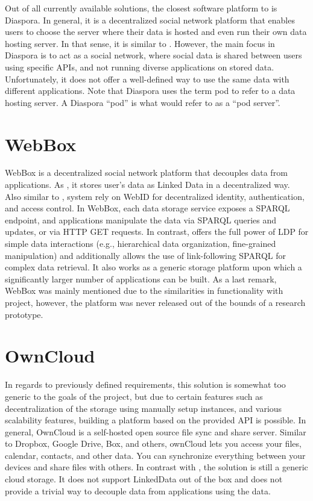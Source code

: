 Out of all currently available solutions, the closest software platform to \solid{} is Diaspora. In general, it is a decentralized social network platform that enables users to choose the server where their data is hosted and even run their own data hosting server. In that sense, it is similar to \solid{}. However, the main focus in Diaspora is to act as a social network, where social data is shared between users using specific APIs, and not running diverse applications on stored data. Unfortunately, it does not offer a well-defined way to use the same data with different applications. Note that Diaspora uses the term pod to refer to a data hosting server. A Diaspora “pod” is what \solid{} would refer to as a “pod server”.

\section{WebBox}

WebBox is a decentralized social network platform that decouples data from applications. As \solid{}, it stores user’s data as Linked Data in a decentralized way. Also similar to \solid{}, system rely on WebID for decentralized identity, authentication, and access control. In WebBox, each data storage service exposes a SPARQL endpoint, and applications manipulate the data via SPARQL queries and updates, or via HTTP GET requests. In contrast, \solid{} offers the full power of LDP for simple data interactions (e.g., hierarchical data organization, fine-grained manipulation) and additionally allows the use of link-following SPARQL for complex data retrieval. It also works as a generic storage platform upon which a significantly larger number of applications can be built. As a last remark, WebBox was mainly mentioned due to the similarities in functionality with \solid{} project, however, the platform was never released out of the bounds of a research prototype.

\section{OwnCloud}

In regards to previously defined requirements, this solution is somewhat too generic to the goals of the project, but due to certain features such as decentralization of the storage using manually setup instances, and various scalability features, building a platform based on the provided API is possible. In general, OwnCloud is a self-hosted open source file sync and share server. Similar to Dropbox, Google Drive, Box, and others, ownCloud lets you access your files, calendar, contacts, and other data. You can synchronize everything between your devices and share files with others. In contrast with \solid{}, the solution is still a generic cloud storage. It does not support LinkedData out of the box and does not provide a trivial way to decouple data from applications using the data. 

